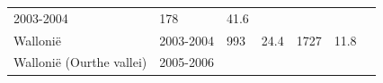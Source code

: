 \documentclass[twoside]{extreport}
\begin{document}
\begin{longtable}[]{@{}lllllll@{}}
\begin{minipage}[t]{0.13\columnwidth}
2003-2004\strut
\end{minipage} & \begin{minipage}[t]{0.06\columnwidth}\raggedright\strut
178\strut
\end{minipage} & \begin{minipage}[t]{0.07\columnwidth}\raggedright\strut
41.6\strut
\end{minipage} & \begin{minipage}[t]{0.09\columnwidth}\raggedright\strut
\strut
\end{minipage} & \begin{minipage}[t]{0.07\columnwidth}\raggedright\strut
\strut
\end{minipage} & \begin{minipage}[t]{0.19\columnwidth}\raggedright\strut
\citet{Flament2004echino}\strut
\end{minipage}\tabularnewline
\begin{minipage}[t]{0.20\columnwidth}\raggedright\strut
Wallonië\strut
\end{minipage} & \begin{minipage}[t]{0.13\columnwidth}\raggedright\strut
2003-2004\strut
\end{minipage} & \begin{minipage}[t]{0.06\columnwidth}\raggedright\strut
993\strut
\end{minipage} & \begin{minipage}[t]{0.07\columnwidth}\raggedright\strut
24.4\strut
\end{minipage} & \begin{minipage}[t]{0.09\columnwidth}\raggedright\strut
1727\strut
\end{minipage} & \begin{minipage}[t]{0.07\columnwidth}\raggedright\strut
11.8\strut
\end{minipage} & \begin{minipage}[t]{0.19\columnwidth}\raggedright\strut
\citet{hanosset2008echinococcus}\strut
\end{minipage}\tabularnewline
\begin{minipage}[t]{0.20\columnwidth}\raggedright\strut
Wallonië (Ourthe vallei)\strut
\end{minipage} & \begin{minipage}[t]{0.13\columnwidth}\raggedright\strut
2005-2006\strut
\end{minipage} & \begin{minipage}[t]{0.06\columnwidth}\raggedright\strut
\strut
\end{minipage} & \begin{minipage}[t]{0.07\columnwidth}\raggedright\strut

\end{minipage}
\end{longtable}
\end{document}
